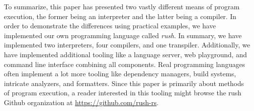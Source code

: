To summarize, this paper has presented two vastly different means of program execution,
the former being an interpreter and the latter being a compiler.
In order to demonstrate the differences using practical examples,
we have implemented our own programming language called \emph{rush}.
In summary, we have implemented two interpreters, four compilers, and one transpiler.
Additionally, we have implemented additional tooling like a language server, web playground, and command line interface combining all components.
Real programming languages often implement a lot more tooling like dependency managers, build systems, intricate analyzers, and formatters.
Since this paper is primarily about methods of program execution, a reader interested in this tooling might browse the rush Github organization at \url{https://github.com/rush-rs}.
